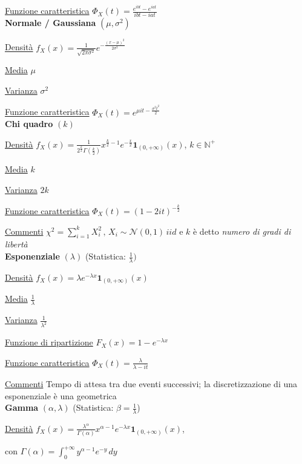 \documentclass[openany]{book} %
\begin{document}
\begin{multicols}{2}
\underline{Funzione caratteristica} $\Phi_X(t)=\frac{e^{ibt}-e^{iat}}{ibt-iat}$
\\

\textbf{Normale / Gaussiana} $(\mu,\sigma^2)$

\underline{Densità} $f_X(x) = \frac{1}{\sqrt{2\pi\sigma^2}}e^{-\frac{(x-\mu)^2}{2\sigma^2}}$

\underline{Media} $\mu$

\underline{Varianza} $\sigma^2$

\underline{Funzione caratteristica} $\Phi_X(t)=e^{\mu it-\frac{\sigma^2t^2}{2}}$
\\

\textbf{Chi quadro} $(k)$

\underline{Densità} $f_X(x) = \frac{1}{2^{\frac{k}{2}}\Gamma(\frac{k}{2})}x^{\frac{k}{2}-1}e^{-\frac{x}{2}}\boldsymbol{1}_{(0,+\infty)}(x)$, $k\in \mathbb{N}^+$

\underline{Media} $k$

\underline{Varianza} $2k$

\underline{Funzione caratteristica} $\Phi_X(t)= (1-2it)^{-\frac{k}{2}}$

\underline{Commenti} $\chi^2=\sum_{i=1}^k X_i^2\,,\,X_i\sim \mathcal{N}(0,1)\,iid$  e $k$ è detto \textit{numero di gradi di libertà}
\\

\textbf{Esponenziale} $(\lambda)$ (Statistica: $\frac{1}{\lambda})$

\underline{Densità} $f_X(x) = \lambda e^{-\lambda x}\boldsymbol{1}_{(0,+\infty)}(x)$

\underline{Media} $\frac{1}{\lambda}$

\underline{Varianza} $\frac{1}{\lambda^2}$

\underline{Funzione di ripartizione} $F_X(x)=1-e^{-\lambda x}$

\underline{Funzione caratteristica} $\Phi_X(t)=\frac{\lambda}{\lambda-it}$

\underline{Commenti} Tempo di attesa tra due eventi successivi; la discretizzazione di una esponenziale è una geometrica
\\

\textbf{Gamma} $(\alpha, \lambda)$ (Statistica: $\beta=\frac{1}{\lambda}$)

\underline{Densità} $f_X(x) = \frac{\lambda^\alpha}{\Gamma(\alpha)}x^{\alpha-1}e^{-\lambda x}\boldsymbol{1}_{(0,+\infty)}(x)$,

con $\Gamma(\alpha)=\int_0^{+\infty} y^{\alpha-1}e^{-y}\,dy$


\end{multicols}
\end{document}
